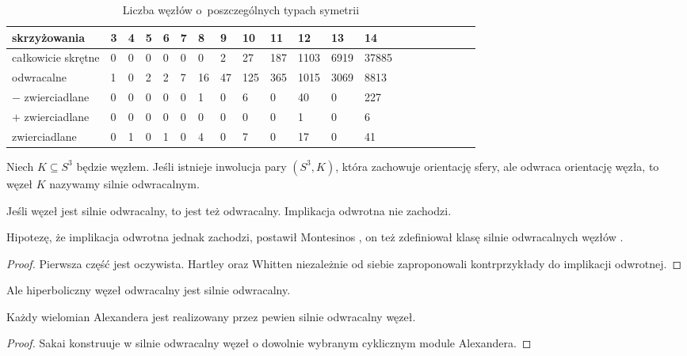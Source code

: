 \begin{table}[h]
    \centering
    \begin{tabular}{@{}*{20}l@{}} \toprule
        skrzyżowania & 3 & 4 & 5 & 6 & 7 & 8 & 9 & 10 & 11 & 12 & 13 & 14 \\ \midrule
        całkowicie skrętne & 0 & 0 & 0 & 0 & 0 & 0 & 2 & 27 & 187 & 1103 & 6919 & 37885 \\
        odwracalne & 1 & 0 & 2 & 2 & 7 & 16 & 47 & 125 & 365 & 1015 & 3069 & 8813 \\
        $-$ zwierciadlane & 0 & 0 & 0 & 0 & 0 & 1 & 0 & 6 & 0 & 40 & 0 & 227 \\
        $+$ zwierciadlane & 0 & 0 & 0 & 0 & 0 & 0 & 0 & 0 & 0 & 1 & 0 & 6 \\
        zwierciadlane & 0 & 1 & 0 & 1 & 0 & 4 & 0 & 7 & 0 & 17 & 0 & 41 \\
        \bottomrule
        \hline
    \end{tabular}
    \caption{Liczba węzłów o~poszczególnych typach symetrii}
\end{table}

\begin{definition}
    Niech $K \subseteq S^3$ będzie węzłem.
    Jeśli istnieje inwolucja pary $(S^3, K)$, która zachowuje orientację sfery, ale odwraca orientację węzła, to węzeł $K$ nazywamy silnie odwracalnym.
\end{definition}

\begin{proposition}
    Jeśli węzeł jest silnie odwracalny, to jest też odwracalny.
    Implikacja odwrotna nie zachodzi.
\end{proposition}

Hipotezę, że implikacja odwrotna jednak zachodzi, postawił Montesinos \cite[problem 1.6]{kirby78}, on też zdefiniował klasę silnie odwracalnych węzłów \cite{montesinos75}.
%

\begin{proof}
%
%
    Pierwsza część jest oczywista.
    Hartley \cite{hartley80} oraz Whitten \cite{whitten81} niezależnie od siebie zaproponowali kontrprzykłady do implikacji odwrotnej.
\end{proof}

Ale hiperboliczny węzeł odwracalny jest silnie odwracalny.

\begin{proposition}
    Każdy wielomian Alexandera jest realizowany przez pewien silnie odwracalny węzeł.
\end{proposition}

\begin{proof}
%
    Sakai konstruuje w \cite{sakai83} silnie odwracalny węzeł o dowolnie wybranym cyklicznym module Alexandera.
\end{proof}


